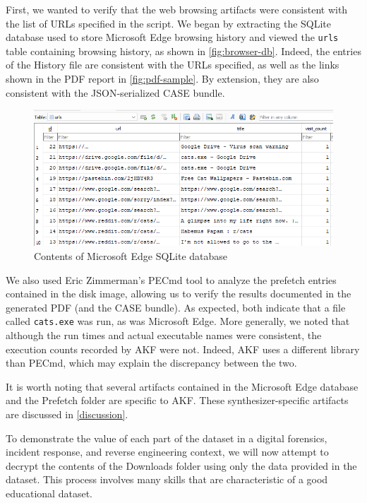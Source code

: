 \documentclass[final,5p,times,twocolumn]{elsarticle}
\newcommand{\passthrough}[1]{#1}
\begin{document}
First, we wanted to verify that the web browsing artifacts were
consistent with the list of URLs specified in the script. We began by
extracting the SQLite database used to store Microsoft Edge browsing
history and viewed the \passthrough{\lstinline!urls!} table containing
browsing history, as shown in \autoref{fig:browser-db}. Indeed, the
entries of the History file are consistent with the URLs specified, as
well as the links shown in the PDF report in \autoref{fig:pdf-sample}.
By extension, they are also consistent with the JSON-serialized CASE
bundle.

\begin{figure}[htbp]
\centering
\includegraphics[width=1\linewidth]{browser-db.png}
\caption{Contents of Microsoft Edge SQLite
database}\label{fig:browser-db}
\end{figure}

We also used Eric Zimmerman's PECmd tool to analyze the prefetch entries
contained in the disk image, allowing us to verify the results
documented in the generated PDF (and the CASE bundle). As expected, both
indicate that a file called \passthrough{\lstinline!cats.exe!} was run,
as was Microsoft Edge. More generally, we noted that although the run
times and actual executable names were consistent, the execution counts
recorded by AKF were not. Indeed, AKF uses a different library than
PECmd, which may explain the discrepancy between the two.

It is worth noting that several artifacts contained in the Microsoft
Edge database and the Prefetch folder are specific to AKF. These
synthesizer-specific artifacts are discussed in \autoref{discussion}.

To demonstrate the value of each part of the dataset in a digital
forensics, incident response, and reverse engineering context, we will
now attempt to decrypt the contents of the Downloads folder using only
the data provided in the dataset. This process involves many skills that
are characteristic of a good educational dataset.
\end{document}
